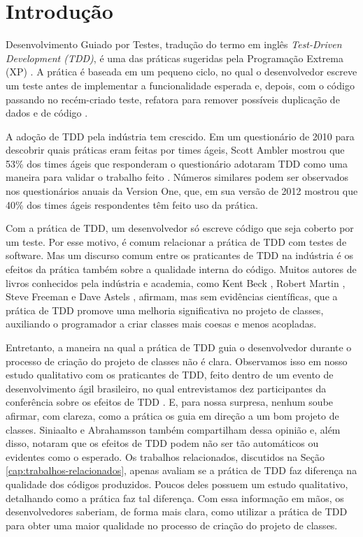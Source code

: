 \documentclass[conference]{IEEEtran}
\begin{document}

\IEEEpeerreviewmaketitle

\section{Introdução}

Desenvolvimento Guiado por Testes, tradução do termo
em inglês \textit{Test-Driven Development (TDD)},
é uma das práticas sugeridas pela Programação
Extrema (XP) \cite{XPExplained}. A prática é baseada em um pequeno ciclo, 
no qual o desenvolvedor escreve um teste antes
de implementar a funcionalidade esperada e, depois, com o código
passando no recém-criado teste, refatora para 
remover possíveis duplicação de dados e de código \cite{TDDByExample}.

A adoção de TDD pela indústria tem crescido. 
Em um questionário de 2010 para descobrir quais práticas eram feitas por times
ágeis, Scott Ambler mostrou que 53\% dos times ágeis que responderam o questionário
adotaram TDD como uma maneira para validar o trabalho feito \cite{wambler-survey-agile}.
Números similares podem ser observados nos questionários anuais da Version One, que,
em sua versão de 2012 \cite{versionone-2012} mostrou que 40\% dos times ágeis respondentes têm 
feito uso da prática.

Com a prática de TDD, um desenvolvedor só escreve código
que seja coberto por um teste. Por esse motivo, é comum relacionar a prática
de TDD com testes de software. Mas um discurso comum entre os praticantes de TDD
na indústria é os efeitos da prática também sobre a qualidade interna do código.
Muitos autores de livros conhecidos pela indústria e academia, como
Kent Beck \cite{TDDByExample}, Robert Martin \cite{agile-ppp}, 
Steve Freeman \cite{GOOS} e Dave Astels \cite{astels-tdd}, afirmam, mas sem evidências científicas, 
que a prática de TDD
promove uma melhoria significativa no projeto de classes, auxiliando
o programador a criar classes mais coesas e menos acopladas.

Entretanto, a maneira na qual a prática de TDD guia o desenvolvedor
durante o processo de criação do projeto de classes não é clara. Observamos
isso em nosso estudo qualitativo com os praticantes de TDD, feito dentro de um
evento de desenvolvimento ágil brasileiro, no qual entrevistamos dez
participantes da conferência sobre os efeitos de TDD \cite{aniche-wbma}. 
E, para nossa surpresa,
nenhum soube afirmar, com clareza, como a prática os guia em direção
a um bom projeto de classes.
Siniaalto e Abrahamsson \cite{alarming-results} também
compartilham dessa opinião e, além disso, notaram que os efeitos de TDD podem 
não ser tão automáticos ou evidentes como o esperado.
Os trabalhos relacionados, discutidos na Seção \ref{cap:trabalhos-relacionados},
apenas avaliam se a prática de TDD faz diferença na qualidade dos códigos produzidos.
Poucos deles possuem um estudo qualitativo, detalhando como a prática
faz tal diferença.
Com essa informação em mãos, os desenvolvedores saberiam, de forma mais clara,
como utilizar a prática de TDD para obter uma maior qualidade no processo de criação
do projeto de classes. 
\end{document}
